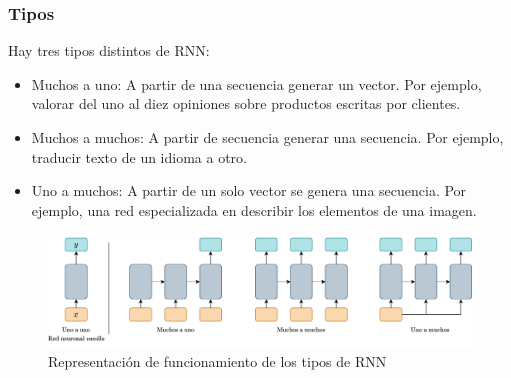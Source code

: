 \subsubsection{Tipos}
Hay tres tipos distintos de RNN:
\begin{itemize}
    \item Muchos a uno: A partir de una secuencia generar un vector. Por ejemplo, valorar del uno al diez opiniones sobre productos escritas por clientes.
    \item Muchos a muchos: A partir de secuencia generar una secuencia. Por ejemplo, traducir texto de un idioma a otro.
    \item Uno a muchos: A partir de un solo vector se genera una secuencia. Por ejemplo, una red especializada en describir los elementos de una imagen.
\end{itemize}

\begin{figure}[H]
    \centering
    \includegraphics[width=14cm]{images/state-of-art/rnn/rnn-types.png}
    \caption{Representación de funcionamiento de los tipos de RNN}
    \label{fig:rnn_types}
\end{figure}
